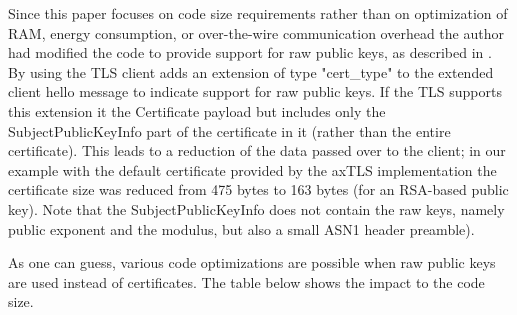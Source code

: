 \documentclass[a4paper, 10pt]{IEEEtran}
\begin{document}
Since this paper focuses on code size requirements rather than on optimization of RAM, energy consumption, or over-the-wire communication overhead the author had modified the code to provide support for raw public keys, as described in \cite{I-d.ietf-tls-oob-pubkey}. By using \cite{I-d.ietf-tls-oob-pubkey} the TLS client adds an extension of type "cert\_type" to the extended client hello message to indicate support for raw public keys. If the TLS supports this extension it the Certificate payload but includes only the SubjectPublicKeyInfo part of the certificate in it (rather than the entire certificate). This leads to a reduction of the data passed over to the client; in our example with the default certificate provided by the axTLS implementation the certificate size was reduced from 475 bytes to 163 bytes (for an RSA-based public key). Note that the SubjectPublicKeyInfo does not contain the raw keys, namely public exponent and the modulus, but also a small ASN1 header preamble).  

As one can guess, various code optimizations are possible when raw public keys are used instead of certificates. The table below shows the impact to the code size. 
\end{document}
